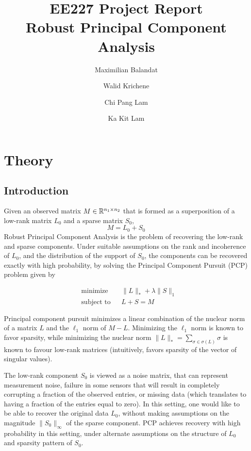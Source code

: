 \documentclass{../../common/projectreport}
\title{\Large EE227 Project Report \\ Robust Principal Component Analysis}
\author{Maximilian Balandat \and Walid Krichene \and Chi Pang Lam \and Ka Kit Lam}
\begin{document}
\maketitle




\chapter{Theory}


\section{Introduction}
Given an observed matrix $M \in {\mathbb R}^{n_1 \times n_2}$ that is formed as a superposition of a low-rank matrix $L_0$ and a sparse matrix $S_0$,
\[
M = L_0 + S_0
\]
Robust Principal Component Analysis \cite{Candes:2011fk} is the problem of recovering the low-rank and sparse components. Under suitable assumptions on the rank and incoherence of $L_0$, and the distribution of the support of $S_0$, the components can be recovered exactly with high probability, by solving the Principal Component Pursuit (PCP) problem given by

\begin{equation}
\begin{aligned}
&\text{minimize} && \|L\|_* + \lambda \|S\|_1 \\
&\text{subject to} && L+S = M
\label{eq:pcp}
\end{aligned}
\end{equation}

Principal component pursuit minimizes a linear combination of the nuclear norm of a matrix $L$ and the $\ell_1$ norm of $M-L$. Minimizing the $\ell_1$ norm is known to favor sparsity, while minimizing the nuclear norm $\|L\|_* = \sum_{\sigma \in \sigma(L)} \sigma$ is known to favour low-rank matrices (intuitively, favors sparsity of the vector of singular values).

The low-rank component $S_0$ is viewed as a noise matrix, that can represent measurement noise, failure in some sensors that will result in completely corrupting a fraction of the observed entries, or missing data (which translates to having a fraction of the entries equal to zero). In this setting, one would like to be able to recover the original data $L_0$, without making assumptions on the magnitude $\|S_0\|_\infty$ of the sparse component. PCP achieves recovery with high probability in this setting, under alternate assumptions on the structure of $L_0$ and sparsity pattern of $S_0$.
\end{document}
